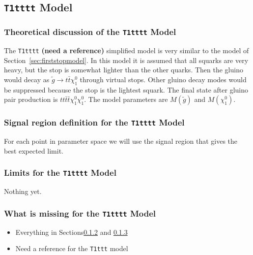 \subsection{{\tt T1tttt} Model}
\label{t1ttmodel}

\subsubsection{Theoretical discussion of the {\tt T1tttt} Model}
\label{sec:t1tttheory}
The {\tt T1tttt} {\bf (need a reference)} simplified model is very similar to the model of 
Section~\ref{sec:firststopmodel}.  In this model it is assumed that all squarks 
are very heavy, but the stop is somewhat lighter than the other 
quarks\cite{stopVirtual}\cite{stopVirtualPRD}.
Then the gluino would decay as $\widetilde{g} \to t\bar{t}\chi_1^0$ through virtual stops.
Other gluino decay modes would be suppressed because the stop is the lightest squark.
The final state after gluino pair production is $tt\bar{t}\bar{t}\chi_1^0\chi_1^0$.
The model parameters are $M(\widetilde{g})$ and $M(\chi_1^0)$.



\subsubsection{Signal region definition for the {\tt T1tttt} Model}
\label{sec:t1ttttdefinition}
For each point in parameter space we will use the signal region that gives
the best expected limit.

\subsubsection{Limits for the {\tt T1tttt} Model}
\label{sec:t1ttttlimits}
Nothing yet.

\subsubsection{What is missing for the {\tt T1tttt} Model}
\begin{itemize}
\item Everything in Sections\ref{sec:t1ttttdefinition} and \ref{sec:t1ttttlimits}
\item Need a reference for the {\tt T1ttt} model
\end{itemize}



